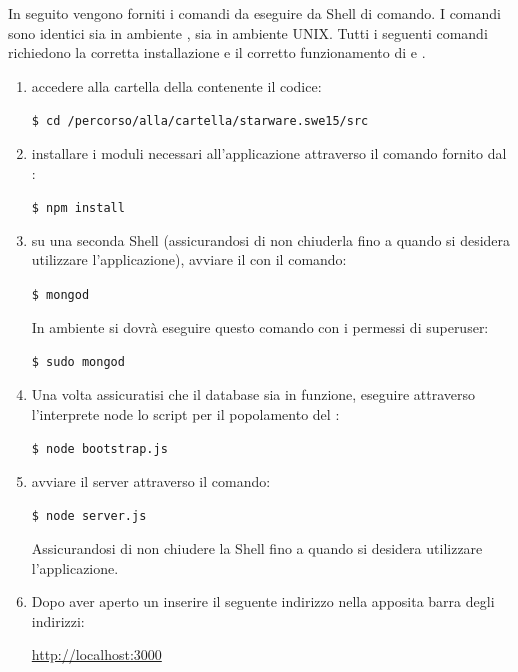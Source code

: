\documentclass[12pt,a4paper]{article}
\begin{document}
	In seguito vengono forniti i comandi da eseguire da Shell di comando. I comandi sono identici sia in ambiente , sia in ambiente UNIX.
	Tutti i seguenti comandi richiedono la corretta installazione e il corretto funzionamento di  e .
	\begin{enumerate}
		\item accedere alla cartella della  contenente il codice:
		\begin{center}
			\texttt{\$ cd /percorso/alla/cartella/starware.swe15/src} 
		\end{center}
		\item installare i moduli  necessari all'applicazione attraverso il comando fornito dal :
		\begin{center}
			\texttt{\$ npm install} 
		\end{center}
		\item su una seconda Shell (assicurandosi di non chiuderla fino a quando si desidera utilizzare l'applicazione), avviare il   con il comando:
		\begin{center}
			\texttt{\$ mongod} 	
		\end{center}	
		In ambiente  si dovrà eseguire questo comando con i permessi di superuser:
		\begin{center}
			\texttt{\$ sudo mongod} 	
		\end{center}
		\item Una volta assicuratisi che il database sia in funzione, eseguire attraverso l'interprete node lo script per il popolamento del :
		\begin{center}
			\texttt{\$ node bootstrap.js} 	
		\end{center} 
		\item avviare il server  attraverso il comando:
		\begin{center}
			\texttt{\$ node server.js} 	
		\end{center} 
		Assicurandosi di non chiudere la Shell fino a quando si desidera utilizzare l'applicazione.
		\item Dopo aver aperto un  inserire il seguente indirizzo nella apposita barra degli indirizzi:
		\begin{center}
			\url{http://localhost:3000}
		\end{center}
			
	\end{enumerate}
		
\end{document}
